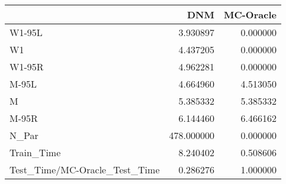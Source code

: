 \begin{tabular}{lrr}
\toprule
{} &         DNM &  MC-Oracle \\
\midrule
W1-95L                        &    3.930897 &   0.000000 \\
W1                            &    4.437205 &   0.000000 \\
W1-95R                        &    4.962281 &   0.000000 \\
M-95L                         &    4.664960 &   4.513050 \\
M                             &    5.385332 &   5.385332 \\
M-95R                         &    6.144460 &   6.466162 \\
N\_Par                         &  478.000000 &   0.000000 \\
Train\_Time                    &    8.240402 &   0.508606 \\
Test\_Time/MC-Oracle\_Test\_Time &    0.286276 &   1.000000 \\
\bottomrule
\end{tabular}
